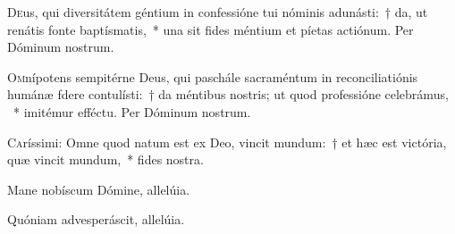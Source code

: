 \documentclass[vesperale_romanum.tex]{subfiles}
\begin{document}



\oratio

\lettrine{D}{e}us, qui diversitátem géntium in confessióne tui nóminis adunásti:~† da, ut renátis fonte baptísmatis,~* una sit fides méntium et píetas actiónum.
Per Dóminum nostrum.



\oratio

\lettrine{O}{m}nípotens sempitérne Deus, qui paschále sacraméntum in reconciliatiónis humánæ f\ooalign{\hss\kern.2ex\'{}\hss\crcr\oe}dere contulísti:~† da méntibus nostris; ut quod professióne celebrámus, ~* imitémur efféctu. Per Dóminum nostrum.






\label{cap_dom_in_albis}

\lettrine{C}{a}ríssimi: Omne quod natum est ex Deo, vincit mundum:~† et hæc est victória, quæ vincit mundum,~* fides nostra.

\label{hy_ad_regias_agni_dapes}

\hymnus


\altertonus




\vv Mane nobíscum Dómine, allelúia.

\rr Quóniam advesperáscit, allelúia.


\end{document}
